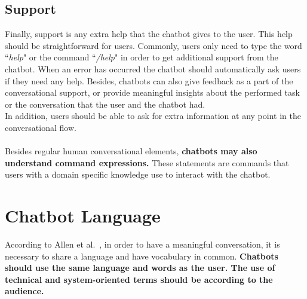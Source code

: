 \documentclass[a4paper,10pt]{article}
\begin{document}
\subsection{Support}
Finally, support is any extra help that the chatbot gives to the user. This help should be straightforward for users. Commonly, users only need to type the word ``\textit{help}" or the command ``\textit{/help}" in order to get additional support from the chatbot. When an error has occurred the chatbot should automatically ask users if they need any help. Besides, chatbots can also give feedback as a part of the conversational support, or provide meaningful insights about the performed task or the conversation that the user and the chatbot had.\\[0\baselineskip] In addition, users should be able to ask for extra information at any point in the conversational flow.
\\
\\
Besides regular human conversational elements, \textbf{chatbots may also understand command expressions.} These statements are commands that users with a domain specific knowledge use to interact with the chatbot.


\section{Chatbot Language}
According to Allen et al.~\cite{allen1978conversation}, in order to have a meaningful conversation, it is necessary to share a language and have vocabulary in common. \textbf{Chatbots should use the same language and words as the user. The use of technical and system-oriented terms should be according to the audience.} 
\end{document}
